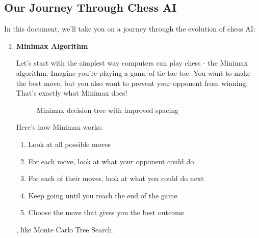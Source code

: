\documentclass[11pt]{article}
\begin{document}
\subsection{Our Journey Through Chess AI}

In this document, we'll take you on a journey through the evolution of chess AI:

\begin{enumerate}
    \item \textbf{Minimax Algorithm}

Let's start with the simplest way computers can play chess - the Minimax algorithm. Imagine you're playing a game of tic-tac-toe. You want to make the best move, but you also want to prevent your opponent from winning. That's exactly what Minimax does!

\begin{figure}[ht]
    \centering
    \caption{Minimax decision tree with improved spacing}
    \label{fig:minimax_tree}
\end{figure}

Here's how Minimax works:
\begin{enumerate}
    \item Look at all possible moves
    \item For each move, look at what your opponent could do
    \item For each of their moves, look at what you could do next
    \item Keep going until you reach the end of the game
    \item Choose the move that gives you the best outcome
\end{enumerate}, like Monte Carlo Tree Search.


\end{enumerate}
\end{document}
